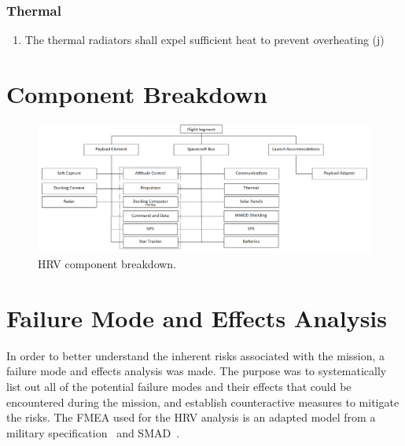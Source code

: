 \documentclass[paper=letter, fontsize=11pt]{scrartcl} %
\numberwithin{equation}{section} %
\numberwithin{figure}{section} %
\numberwithin{table}{section} %
\begin{document}
\subsubsection{Thermal}
\begin{enumerate}
    \item The thermal radiators shall expel sufficient heat to prevent overheating (j)
\end{enumerate}




\section{Component Breakdown}
\begin{figure}[H]
    \begin{center}
        \includegraphics[width=1\textwidth]{figs/ProductBreakdown.PNG}
        \caption{HRV component breakdown.}
    \end{center}
\end{figure}



\section{Failure Mode and Effects Analysis}
In order to better understand the inherent risks associated with the mission, a failure mode and effects analysis was made. The purpose was to systematically list out all of the potential failure modes and their effects that could be encountered during the mission, and establish counteractive measures to mitigate the risks. The FMEA used for the HRV analysis is an adapted model from a military specification~\cite{MIL-STD-1629A} and SMAD~\cite{ref12_8}.
\end{document}
